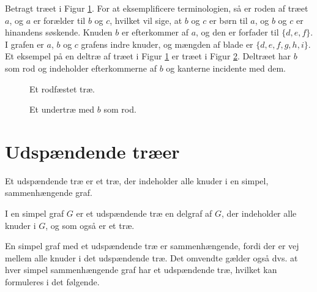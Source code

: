 \begin{exmp}
Betragt træet i Figur \ref{eksempel_rootedtree}. 
For at eksemplificere terminologien, så er roden af træet $a$, og $a$ er forælder til $b$ og $c$, hvilket vil sige, at $b$ og $c$ er børn til $a$, og $b$ og $c$ er hinandens søskende. 
Knuden $b$ er efterkommer af $a$, og den er forfader til $\lbrace d, e, f \rbrace$. 
I grafen er $a$, $b$ og $c$ grafens indre knuder, og mængden af blade er $\lbrace d, e, f, g, h, i \rbrace$. 
Et eksempel på en deltræ af træet i Figur \ref{eksempel_rootedtree} er træet i Figur \ref{eksempel_rootedsubtree}.
Deltræet har $b$ som rod og indeholder efterkommerne af $b$ og kanterne incidente med dem. 
\end{exmp}

\begin{figure}[h]
\centering
{}
\caption{Et rodfæstet træ.} 
\label{eksempel_rootedtree}
\end{figure}

\begin{figure}[h]
\centering
{}
\caption{Et undertræ med $b$ som rod.} 
\label{eksempel_rootedsubtree}
\end{figure}


\section{Udspændende træer}

Et udspændende træ er et træ, der indeholder alle knuder i en simpel, sammenhængende graf.

\begin{defn}
I en simpel graf $G$ er et udspændende træ en delgraf af $G$, der indeholder alle knuder i $G$, og som også er et træ.
\end{defn}

\noindent En simpel graf med et udspændende træ er sammenhængende, fordi der er vej mellem alle knuder i det udspændende træ. Det omvendte gælder også dvs. at hver simpel sammenhængende graf har et udspændende træ, hvilket kan formuleres i det følgende.

